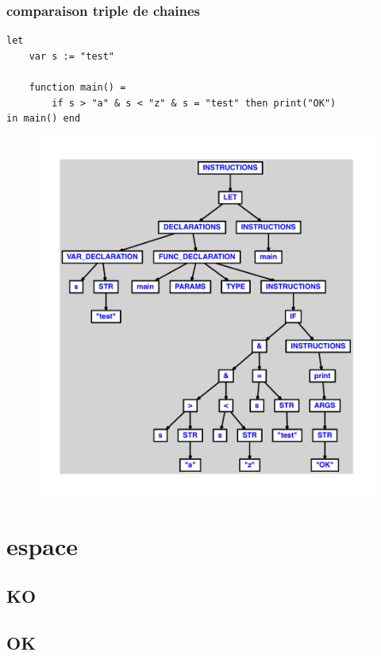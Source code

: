\documentclass{article}
\begin{document}
\subsubsection{comparaison triple de chaines}
\begin{lstlisting}
let
	var s := "test"

	function main() =
		if s > "a" & s < "z" & s = "test" then print("OK")
in main() end
\end{lstlisting}
\newpage
\begin{figure}[H]
\centering
\includegraphics[max width=\textwidth]{ast/ast_182.pdf}
\end{figure}
\newpage
\section{espace}
\subsection{KO}
\subsection{OK}
\end{document}
